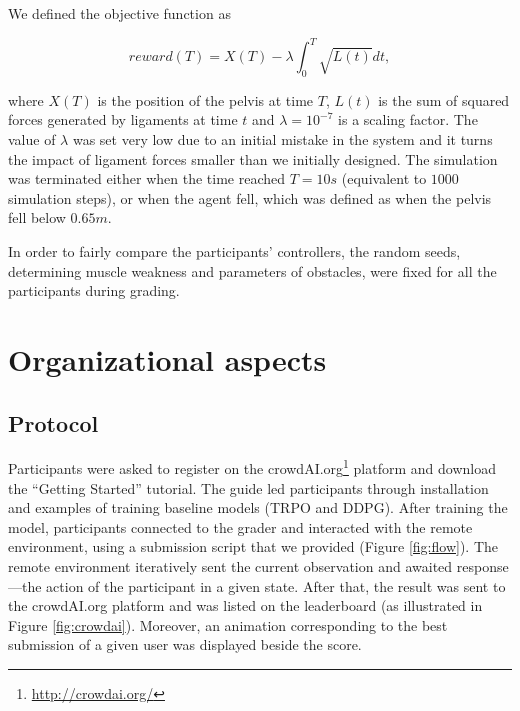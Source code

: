 \documentclass[graybox]{svmult}
\begin{document}
We defined the objective function as

\[reward(T) = X(T) - \lambda \int_0^T \sqrt{L(t)}dt,\]

where $X(T)$ is the position of the pelvis at time $T$, $L(t)$ is the sum of squared forces generated by ligaments at time $t$ and $\lambda = 10^{-7}$ is a scaling factor. 
The value of $\lambda$ was set very low due to an initial mistake in the system and it turns the impact of ligament forces smaller than we initially designed. The simulation was terminated either when the time reached $T=10s$ (equivalent to $1000$ simulation steps), or when the agent fell, which was defined as when the pelvis fell below $0.65m$.

In order to fairly compare the participants' controllers, the random seeds, determining muscle weakness and parameters of obstacles, were fixed for all the participants during grading.

\section{Organizational aspects}\label{s:organization}
\subsection{Protocol}

Participants were asked to register on the crowdAI.org\footnote{\url{http://crowdai.org/}} platform and download the ``Getting Started'' tutorial. The guide led participants through installation and examples of training baseline models (TRPO and DDPG). After training the model, participants connected to the grader and interacted with the remote environment, using a submission script that we provided (Figure \ref{fig:flow}). The remote environment iteratively sent the current observation and awaited response---the action of the participant in a given state. After that, the result was sent to the crowdAI.org platform and was listed on the leaderboard (as illustrated in Figure \ref{fig:crowdai}). Moreover, an animation corresponding to the best submission of a given user was displayed beside the score.
\end{document}
